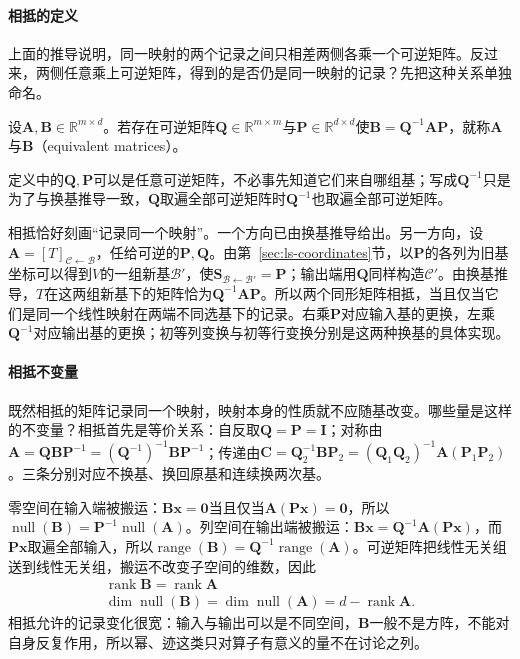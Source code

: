 \paragraph{相抵的定义}
\label{sec:ls-equivalence-meaning}
上面的推导说明，同一映射的两个记录之间只相差两侧各乘一个可逆矩阵。反过来，两侧任意乘上可逆矩阵，得到的是否仍是同一映射的记录？先把这种关系单独命名。
\begin{definition}[矩阵相抵]
\label{def:ls-matrix-equivalence}
设$\bm A,\bm B\in\mathbb R^{m\times d}$。若存在可逆矩阵$\bm Q\in\mathbb R^{m\times m}$与$\bm P\in\mathbb R^{d\times d}$使$\bm B=\bm Q^{-1}\bm A\bm P$，就称$\bm A$与$\bm B$（equivalent matrices）。
\end{definition}
定义中的$\bm Q,\bm P$可以是任意可逆矩阵，不必事先知道它们来自哪组基；写成$\bm Q^{-1}$只是为了与换基推导一致，$\bm Q$取遍全部可逆矩阵时$\bm Q^{-1}$也取遍全部可逆矩阵。

相抵恰好刻画“记录同一个映射”。一个方向已由换基推导给出。另一方向，设$\bm A=[T]_{\mathcal C\leftarrow\mathcal B}$，任给可逆的$\bm P,\bm Q$。由第~\ref{sec:ls-coordinates}节，以$\bm P$的各列为旧基坐标可以得到$V$的一组新基$\mathcal B'$，使$\bm S_{\mathcal B\leftarrow\mathcal B'}=\bm P$；输出端用$\bm Q$同样构造$\mathcal C'$。由换基推导，$T$在这两组新基下的矩阵恰为$\bm Q^{-1}\bm A\bm P$。所以两个同形矩阵相抵，当且仅当它们是同一个线性映射在两端不同选基下的记录。右乘$\bm P$对应输入基的更换，左乘$\bm Q^{-1}$对应输出基的更换；初等列变换与初等行变换分别是这两种换基的具体实现。

\paragraph{相抵不变量}
\label{sec:ls-equivalence-properties}
既然相抵的矩阵记录同一个映射，映射本身的性质就不应随基改变。哪些量是这样的不变量？相抵首先是等价关系：自反取$\bm Q=\bm P=\bm I$；对称由$\bm A=\bm Q\bm B\bm P^{-1}=(\bm Q^{-1})^{-1}\bm B\bm P^{-1}$；传递由$\bm C=\bm Q_2^{-1}\bm B\bm P_2=(\bm Q_1\bm Q_2)^{-1}\bm A(\bm P_1\bm P_2)$。三条分别对应不换基、换回原基和连续换两次基。

零空间在输入端被搬运：$\bm B\bm x=\bm0$当且仅当$\bm A(\bm P\bm x)=\bm0$，所以$\operatorname{null}(\bm B)=\bm P^{-1}\operatorname{null}(\bm A)$。列空间在输出端被搬运：$\bm B\bm x=\bm Q^{-1}\bm A(\bm P\bm x)$，而$\bm P\bm x$取遍全部输入，所以$\operatorname{range}(\bm B)=\bm Q^{-1}\operatorname{range}(\bm A)$。可逆矩阵把线性无关组送到线性无关组，搬运不改变子空间的维数，因此
\begin{equation}
\begin{gathered}
\operatorname{rank}\bm B=\operatorname{rank}\bm A\\
\dim\operatorname{null}(\bm B)=\dim\operatorname{null}(\bm A)=d-\operatorname{rank}\bm A.
\end{gathered}
\label{eq:ls-equivalence-invariants}
\end{equation}
相抵允许的记录变化很宽：输入与输出可以是不同空间，$\bm B$一般不是方阵，不能对自身反复作用，所以幂、迹这类只对算子有意义的量不在讨论之列。

